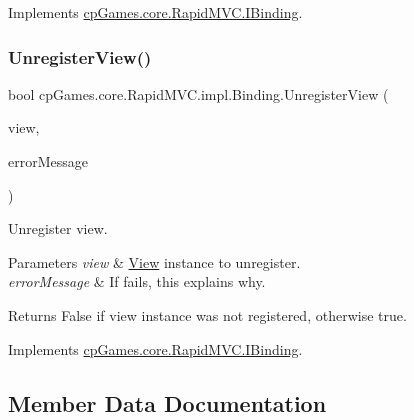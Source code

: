 Implements \mbox{\hyperlink{interfacecp_games_1_1core_1_1_rapid_m_v_c_1_1_i_binding_a600504a6b8ba86a81e02ef03c4dc9e53}{cp\+Games.\+core.\+Rapid\+M\+V\+C.\+I\+Binding}}.

\mbox{\label{classcp_games_1_1core_1_1_rapid_m_v_c_1_1impl_1_1_binding_ad7209adda2ba56a242f1016c877d0883}} 
\subsubsection{\texorpdfstring{UnregisterView()}{UnregisterView()}}
{\footnotesize\ttfamily bool cp\+Games.\+core.\+Rapid\+M\+V\+C.\+impl.\+Binding.\+Unregister\+View (\begin{DoxyParamCaption}\item[{\mbox{\hyperlink{interfacecp_games_1_1core_1_1_rapid_m_v_c_1_1_i_view}{I\+View}}}]{view,  }\item[{out string}]{error\+Message }\end{DoxyParamCaption})}



Unregister view. 


\begin{DoxyParams}{Parameters}
{\em view} & \mbox{\hyperlink{classcp_games_1_1core_1_1_rapid_m_v_c_1_1_view}{View}} instance to unregister.\\
\hline
{\em error\+Message} & If fails, this explains why.\\
\hline
\end{DoxyParams}
\begin{DoxyReturn}{Returns}
False if view instance was not registered, otherwise true.
\end{DoxyReturn}


Implements \mbox{\hyperlink{interfacecp_games_1_1core_1_1_rapid_m_v_c_1_1_i_binding_ab36c868f3a9163935a650c30663f7a97}{cp\+Games.\+core.\+Rapid\+M\+V\+C.\+I\+Binding}}.



\subsection{Member Data Documentation}
\mbox{\label{classcp_games_1_1core_1_1_rapid_m_v_c_1_1impl_1_1_binding_a746307581d56690c0e5234f6cb3f04a5}} 
